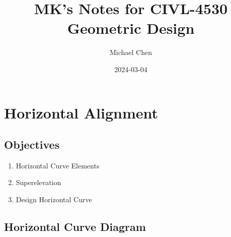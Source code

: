 \documentclass{article}
\title{MK's Notes for CIVL-4530 Geometric Design}
\date{2024-03-04}
\author{Michael Chen}
\begin{document}




  \section{Horizontal Alignment}
  \subsection{Objectives}
  \begin{enumerate}
    \item Horizontal Curve Elements
    \item Superelevation
    \item Design Horizontal Curve
  \end{enumerate}

  \subsection{Horizontal Curve Diagram}
  
\end{document}
